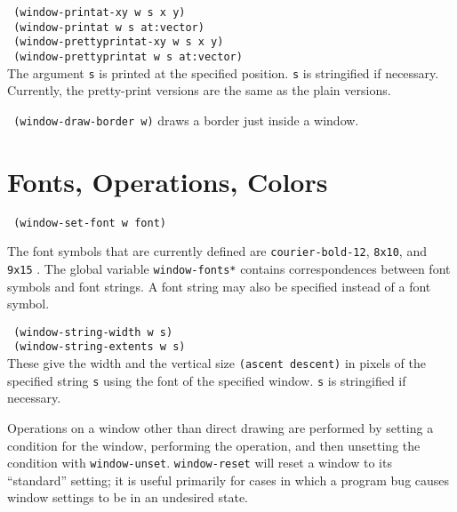 \vspace{0.1in}
{\tt \hspace*{0.5in} (window-printat-xy w s x y)} \\
{\tt \hspace*{0.5in} (window-printat w s at:vector)} \\
{\tt \hspace*{0.5in} (window-prettyprintat-xy w s x y)} \\
{\tt \hspace*{0.5in} (window-prettyprintat w s at:vector)} \\

\vspace{-0.1in}
The argument {\tt s} is printed at the specified position.
{\tt s} is stringified if necessary.
Currently, the pretty-print versions are the same as the plain versions.

\vspace{0.1in}
{\tt \hspace*{0.5in} (window-draw-border w)} draws a border just
inside a window.

\section{Fonts, Operations, Colors}

{\tt \hspace*{0.5in} (window-set-font w font)}

\vspace{-0.1in}
The font symbols that are currently defined are {\tt courier-bold-12},
{\tt 8x10}, and {\tt 9x15} .  The global variable {\tt *window-fonts*}
contains correspondences between font symbols and font strings.
A font string may also be specified instead of a font symbol.

{\tt \hspace*{0.5in} (window-string-width w s)} \\
{\tt \hspace*{0.5in} (window-string-extents w s)} \\
These give the width and the vertical size {\tt (ascent descent)} in pixels
of the specified string {\tt s} using the font of the specified window.
{\tt s} is stringified if necessary.

Operations on a window other than direct drawing are performed by
setting a condition for the window, performing the operation, and then
unsetting the condition with {\tt window-unset}.  {\tt window-reset}
will reset a window to its ``standard'' setting; it is useful primarily
for cases in which a program bug causes window settings to be in an
undesired state.

